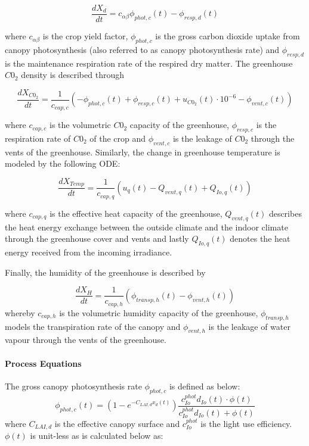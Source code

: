 \begin{equation}
	\frac{dX_d}{dt} = c_{\alpha \beta} \phi_{phot,c}(t) - \phi_{resp,d}(t)
\end{equation}

where $c_{\alpha \beta}$ is the crop yield factor, $\phi_{phot,c}$ is the gross carbon dioxide uptake from canopy photosynthesis (also referred to as canopy photosynthesis rate) and $\phi_{resp,d}$ is the maintenance respiration rate of the respired dry matter. 
The greenhouse $C0_2$ density is described through

\begin{equation}
	\frac{dX_{C0_2}}{dt} = \frac{1}{c_{cap,c}}(-\phi_{phot,c}(t) + \phi_{resp,c}(t) + u_{C0_2}(t) \cdot 10^{-6} - \phi_{vent,c}(t))
\end{equation}

where $c_{cap,c}$ is the volumetric $C0_2$ capacity of the greenhouse, $\phi_{resp,c}$ is the respiration rate of $C0_2$ of the crop and $\phi_{vent,c}$ is the  leakage of $C0_2$ through the vents of the greenhouse. Similarly, the change in greenhouse temperature is modeled by the following ODE:

\begin{equation}
	\frac{dX_{Temp}}{dt} = \frac{1}{c_{cap,q}}(u_{q}(t) - Q_{vent,q}(t) + Q_{Io,q}(t))
\end{equation}

where $c_{cap,q}$ is the effective heat capacity of the greenhouse, $Q_{vent,q}(t)$ describes the heat energy exchange between the outside climate and the indoor climate through the greenhouse cover and vents and lastly $Q_{Io,q}(t)$ denotes the heat energy received from the incoming irradiance.

Finally, the humidity of the greenhouse is described by

\begin{equation}
	\frac{dX_{H}}{dt} = \frac{1}{c_{cap,h}}(\phi_{transp,h}(t) - \phi_{vent,h}(t))
\end{equation}
whereby $c_{cap,h}$ is the volumetric humidity capacity of the greenhouse, $\phi_{transp,h}$ models the transpiration rate of the canopy and $\phi_{vent,h}$ is the leakage of water vapour through the vents of the greenhouse.

\paragraph{Process Equations}
The gross canopy photosynthesis rate $\phi_{phot,c}$ is defined as below:
\begin{equation}
	\phi_{phot,c}(t) = (1 - e^{-C_{LAI,d} x_d(t)}) \frac{c_{Io}^{phot} d_{Io}(t) \cdot \phi(t)}{c_{Io}^{phot} d_{Io}(t) +\phi(t)}
	\label{eq: canopy photosynthesis rate}
\end{equation}
where $C_{LAI,d}$ is the effective canopy surface and $c_{Io}^{phot}$ is the light use efficiency. $\phi(t)$ is unit-less as is calculated below as:

